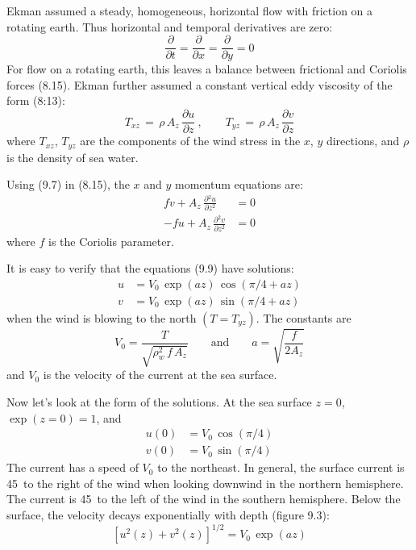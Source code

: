 Ekman assumed a steady,
homogeneous, horizontal flow with friction on a rotating earth. Thus
horizontal and temporal derivatives are zero:
\begin{equation}
\frac{\partial}{\partial{t}}=\frac{\partial}{\partial{x}}=\frac{\partial}{\partial{y}}=0
\end{equation}
For flow on a rotating earth, this leaves a balance between frictional
and Coriolis forces (8.15).  Ekman further assumed a constant vertical
eddy viscosity of the form (8:13):
\begin{equation}
T_{xz} \,=\,\rho\, A_z \,\frac{\partial{u}}{\partial{z}}\: , \qquad T_{yz}\,=\,\rho\, A_z \,\frac{\partial{v}}{\partial{z}}
\end{equation}
where $T_{xz}$, $T_{yz}$ are the components of the wind
stress in the $x$, $y$ directions, and
$\rho$ is the density of sea water.

Using (9.7) in (8.15), the $x$ and $y$ momentum equations are:
\begin{subequations}
\begin{align}
fv +  A_z \, \frac{\partial{^2 u}}{\partial{z^2}} &= 0  \\
-fu + A_z \, \frac{\partial{^2 v}}{\partial{z^2}} &= 0
\end{align}
\end{subequations}
where $f$ is the Coriolis parameter.

It is easy to verify that the equations (9.9) have solutions:
\begin{subequations}
\begin{align}
u &=  V_0\,\exp(az)\,\cos(\pi/4 + az)  \\
v &=  V_0\,\exp(az)\,\sin(\pi/4 + az)
\end{align}
\end{subequations}
when the wind is blowing to the north $(T = T_{yz})$. The constants
are
\begin{equation}
V_0 = \frac{T}{\sqrt{\rho^2_w\,f\,A_z}} \qquad \text{and} \qquad
a=\sqrt{\frac{f}{2A_z}}
\end{equation}
and $V_0$ is the velocity of the current at the sea surface.

Now let's look at the form of the solutions. At the sea surface $z = 0$,
$\exp(z=0) = 1$, and
\begin{subequations}
\begin{align}
u(0) &= V_0\, \cos(\pi/4)  \\
v(0) &= V_0\, \sin(\pi/4)
\end{align}
\end{subequations}
The current has a speed of $V_0$ to the northeast. In general, the
surface current is 45\degrees\ to the right of the wind when looking
downwind in the northern hemisphere. The current is 45\degrees\ to the
left of the wind in the southern hemisphere. Below the surface, the
velocity decays exponentially with depth (figure 9.3):
\begin{equation}
\left[u^2(z) + v^2(z) \right]^{1/2} =V_0\,\exp(az)
\end{equation}

